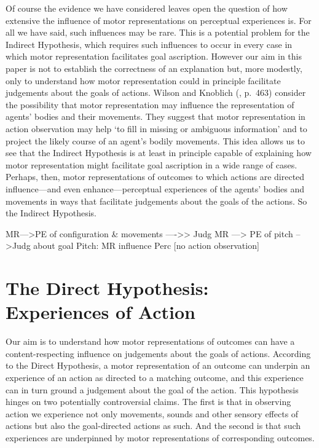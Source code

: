 \documentclass[12pt,\papersize]{extarticle}
\begin{document}
Of course the evidence we have considered leaves open the question of how extensive the influence of motor representations on perceptual experiences is.  For all we have said, such influences may be rare.  This is a potential problem for the Indirect Hypothesis, which requires such influences to occur in every case in which motor representation facilitates goal ascription.  However our aim in this paper is not to establish the correctness of an explanation but, more modestly, only to understand how motor representation could in principle facilitate judgements about the goals of actions.  Wilson and Knoblich (\citeyear{Wilson:2005qu}, p.\ 463) consider the possibility that motor representation may influence the representation of agents' bodies and their movements. They suggest that motor representation in action observation may help `to fill in missing or ambiguous information' and to project the likely course of an agent's bodily movements. This idea allows us to see that the Indirect Hypothesis is at least in principle capable of explaining how motor representation might facilitate goal ascription in a wide range of cases. Perhaps, then, motor representations of outcomes to which actions are directed influence---and even enhance---perceptual experiences of the agents' bodies and movements in ways that facilitate judgements about the goals of the actions.  So the Indirect Hypothesis.


MR--->PE of configuration \& movements ---->> Judg
MR ---> PE of pitch -->Judg about goal
Pitch: MR influence Perc [no action observation]



\section{The Direct Hypothesis: Experiences of Action}
Our aim is to understand how motor representations of outcomes can have a content-respecting influence on judgements about the goals of actions. 
According to the Direct Hypothesis, a motor representation of an outcome can underpin an experience of an action as directed to a matching outcome, and this experience can in turn ground a judgement about the goal of the action.  This hypothesis hinges on two potentially controversial claims.  The first is that in observing action we experience not only movements, sounds and other sensory effects of actions but also the goal-directed actions as such. And the second is that such experiences are underpinned by motor representations of corresponding outcomes.  
\end{document}

